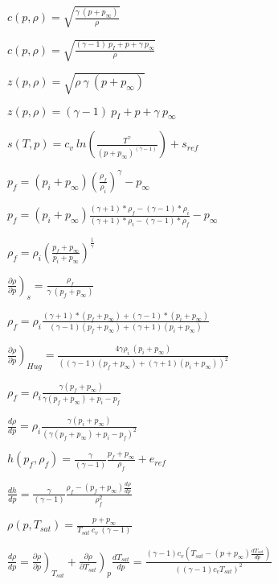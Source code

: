 \documentclass{article}
\begin{document}
$  c(p, \rho)  = \sqrt{  \frac{\gamma \ (p+p_{\infty})}{\rho}} $
\pagebreak

$  c(p, \rho)  = \sqrt{  \frac{(\gamma-1) \ p_I + p + \gamma \ p_{\infty}}{\rho}} $
\pagebreak

$  z(p, \rho)  = \sqrt{ \rho \ \gamma \ (p+p_{\infty}) } $
\pagebreak

$  z(p, \rho)  = (\gamma-1) \ p_I + p + \gamma \ p_{\infty} $
\pagebreak

$  s(T, p)  = c_v \ ln \left( \frac{T^\gamma}  { (p+p_{\infty})^{(\gamma-1)} } \right)+s_{ref} $
\pagebreak

$  p_f = (p_i+p_{\infty})  \left( \frac{\rho_f}{\rho_i} \right) ^\gamma   -p_{\infty} $
\pagebreak

$ p_f = (p_i+p_{\infty}) \frac{  (\gamma+1)*\rho_f - (\gamma-1)*\rho_i  }{  (\gamma+1)*\rho_i-(\gamma-1)*\rho_f  } -p_{\infty} $
\pagebreak

$ \rho_f = \rho_i \left( \frac{p_f+p_{\infty}}{ p_i+p_{\infty}}\right) ^\frac{1}{\gamma} $
\pagebreak

$  \left.  \frac{\partial \rho}{\partial p} \right)_s   = \frac{\rho_f}{ \gamma \ (p_f+p_{\infty})}  $
\pagebreak

$ \rho_f =\rho_i\frac{ (\gamma + 1)*(p_f+p_{\infty}) + (\gamma - 1)*(p_i+p_{\infty})}{(\gamma - 1)(p_f+p_{\infty}) +(\gamma + 1)(p_i+p_{\infty})}$
\pagebreak

$  \left.  \frac{\partial \rho}{\partial p} \right)_{Hug} = \frac{4\gamma \rho_i \ (p_i+p_{\infty})}{ \left( (\gamma - 1)(p_f+p_{\infty}) +(\gamma + 1)(p_i+p_{\infty}) \right) ^2}   $
\pagebreak

$ \rho_f = \rho_i \frac{\gamma (p_f+p_{\infty})}{\gamma (p_f+p_{\infty}) + p_i - p_f} $
\pagebreak

$ \frac{d\rho}{dp} = \rho_i \frac{\gamma (p_i + p_{\infty})}{\left(\gamma (p_f+p_{\infty}) + p_i - p_f\right)^2} $
\pagebreak

$ h(p_f,{\rho_f})= \frac{\gamma}{(\gamma-1)}\frac{p_f+p_{\infty}}{\rho_f} +e_{ref} $
\pagebreak

$ \frac{dh}{dp}=\frac{\gamma}{(\gamma-1)}\frac{ \rho_f - (p_f+p_{\infty})  \frac{d\rho}{dp}  }{\rho_f^2} $
\pagebreak

$  \rho(p, T_{sat})  =  \frac{p+p_{\infty}}{T_{sat} \ c_v \ (\gamma-1)}\ $
\pagebreak

$\frac{d \rho}{d p} = \left.  \frac{\partial \rho}{\partial p} \right)_{T_{sat}} + \left.  \frac{\partial \rho}{\partial T_{sat} } \right)_p  \frac{d T_{sat}}{d p} =\frac{(\gamma-1)c_v\left(T_{sat} - (p+p_{\infty})\frac{d T_{sat}}{d p}\right) }{\left((\gamma-1)c_vT_{sat}\right)^2 }$
\pagebreak
\end{document}
